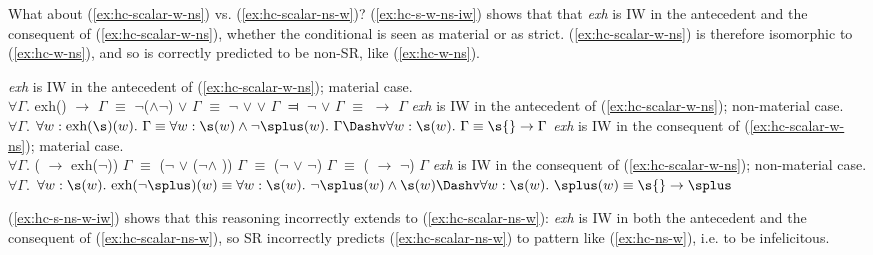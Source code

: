 	What about (\ref{ex:hc-scalar-w-ns}) vs. (\ref{ex:hc-scalar-ns-w})? (\ref{ex:hc-s-w-ns-iw}) shows that that \textit{exh} is IW in the antecedent and the consequent of (\ref{ex:hc-scalar-w-ns}), whether the conditional is seen as material or as strict. (\ref{ex:hc-scalar-w-ns}) is therefore isomorphic to (\ref{ex:hc-w-ns}), and so is correctly predicted to be non-SR, like (\ref{ex:hc-w-ns}).
	
	
	
	
	\begin{exe}
		\ex\label{ex:hc-s-w-ns-iw}
		\begin{xlist}
			\ex\textit{exh} is IW in the antecedent of (\ref{ex:hc-scalar-w-ns}); material case.\\ $\forall \Gamma.$ exh(\s) $\rightarrow$ $\Gamma$ $\equiv$ $\neg$(\s$\wedge$$\neg$\splus) $\vee$ $\Gamma$ $\equiv$ $\neg$\s{} $\vee$ \splus{} $\vee$ $\Gamma$ $\Dashv$ $\neg$\s{} $\vee$ $\Gamma$ $\equiv$ \s{} $\rightarrow$ $\Gamma$
			\ex\textit{exh} is IW in the antecedent of (\ref{ex:hc-scalar-w-ns}); non-material case.\\ $\forall \Gamma.$ $\forall w: \text{exh}(\s)(w). \ \Gamma \equiv \forall w: \s(w) \wedge \neg\splus(w). \ \Gamma \Dashv \forall w: \s(w). \ \Gamma \equiv \s{} \rightarrow \Gamma$
			\ex\textit{exh} is IW in the consequent of (\ref{ex:hc-scalar-w-ns}); material case.\\
			$\forall \Gamma.$ (\s{} $\rightarrow$ exh($\neg$\splus)) $\Gamma$ $\equiv$ ($\neg$\s{} $\vee$ ($\neg$\splus $\wedge$ \s)) $\Gamma$ $\equiv$ ($\neg$\s{} $\vee$ $\neg$\splus) $\Gamma$ $\equiv$ (\s{} $\rightarrow$ $\neg$\splus) $\Gamma$
			\ex\textit{exh} is IW in the consequent of (\ref{ex:hc-scalar-w-ns}); non-material case.\\$\forall \Gamma.$ $\forall w: \s(w). \ \text{exh}(\neg\splus)(w) \equiv \forall w: \s(w). \ \neg\splus(w) \wedge \s(w) \Dashv \forall w: \s(w). \ \splus(w) \equiv \s{} \rightarrow \splus$
		\end{xlist}
	\end{exe}

	
	(\ref{ex:hc-s-ns-w-iw}) shows that this reasoning incorrectly extends to (\ref{ex:hc-scalar-ns-w}): \textit{exh} is IW in both the antecedent and the consequent of (\ref{ex:hc-scalar-ns-w}), so SR incorrectly predicts (\ref{ex:hc-scalar-ns-w}) to pattern like (\ref{ex:hc-ns-w}), i.e. to be infelicitous.
	
